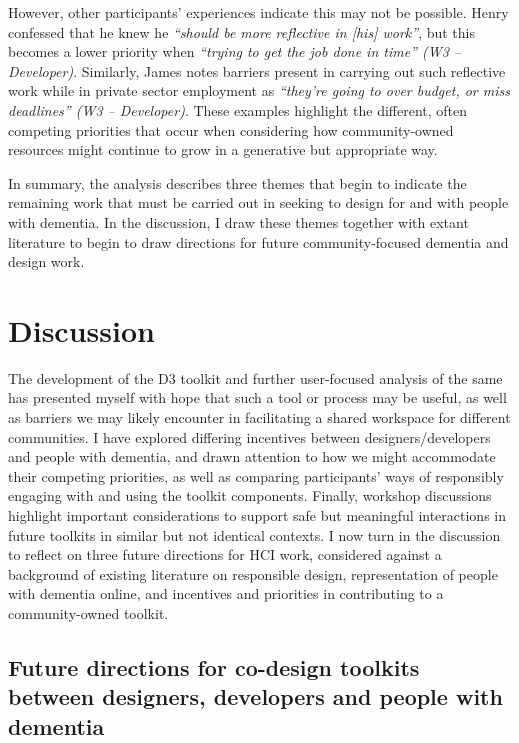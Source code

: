 However, other participants’ experiences indicate this may not be possible. Henry confessed that he knew he \textit{``should be more reflective in [his] work''}, but this becomes a lower priority when \textit{``trying to get the job done in time'' (W3 – Developer)}. Similarly, James notes barriers present in carrying out such reflective work while in private sector employment as \textit{``they're going to over budget, or miss deadlines'' (W3 – Developer)}. These examples highlight the different, often competing priorities that occur when considering how community-owned resources might continue to grow in a generative but appropriate way.

In summary, the analysis describes three themes that begin to indicate the remaining work that must be carried out in seeking to design for and with people with dementia. In the discussion, I draw these themes together with extant literature to begin to draw directions for future community-focused dementia and design work.
\section{Discussion}
\label{D3:Discussion}
The development of the D3 toolkit and further user-focused analysis of the same has presented myself with hope that such a tool or process may be useful, as well as barriers we may likely encounter in facilitating a shared workspace for different communities. I have explored differing incentives between designers/developers and people with dementia, and drawn attention to how we might accommodate their competing priorities, as well as comparing participants’ ways of responsibly engaging with and using the toolkit components. Finally, workshop discussions highlight important considerations to support safe but meaningful interactions in future toolkits in similar but not identical contexts. I now turn in the discussion to reflect on three future directions for HCI work, considered against a background of existing literature on responsible design, representation of people with dementia online, and incentives and priorities in contributing to a community-owned toolkit.

\subsection{Future directions for co-design toolkits between designers, developers and people with dementia}

